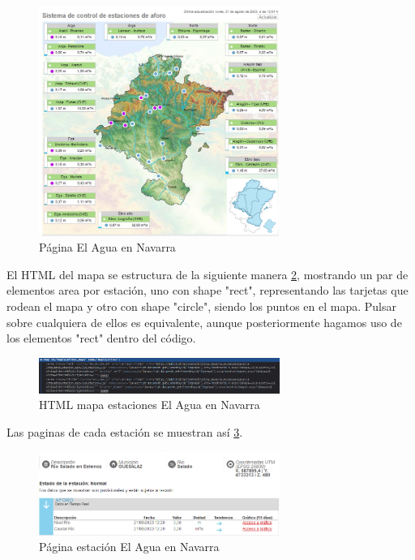 \begin{figure} [H]
	\centering
	\includegraphics[width=0.7\textwidth]{fig/AguaEnNavarraCode.png}
	\caption[Página principal de aforos de El Agua en Navarra]{Página El Agua en Navarra}
	\label{fig:ej4}
\end{figure}

El HTML del mapa se estructura de la siguiente manera \ref{fig:ej22}, mostrando un par de elementos area por estación, uno con shape "rect", representando las tarjetas que rodean el mapa y otro con shape "circle", siendo los puntos en el mapa. Pulsar sobre cualquiera de ellos es equivalente, aunque posteriormente hagamos uso de los elementos "rect" dentro del código.

\begin{figure} [H]
	\centering
	\includegraphics[width=0.7\textwidth]{fig/AguaEnNavarraCodeHTML.png}
	\caption[HTML mapa estaciones de El Agua en Navarra]{HTML mapa estaciones El Agua en Navarra}
	\label{fig:ej22}
\end{figure}

Las paginas de cada estación se muestran así \ref{fig:ej23}.

\begin{figure} [H]
	\centering
	\includegraphics[width=0.7\textwidth]{fig/AguaEnNavarraEstacion.png}
	\caption[Página estación de El Agua en Navarra]{Página estación El Agua en Navarra}
	\label{fig:ej23}
\end{figure}

